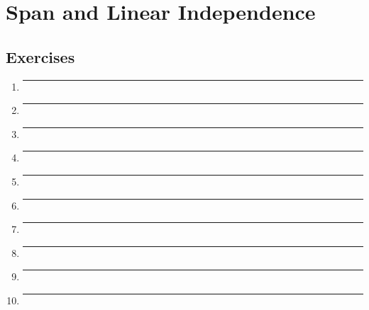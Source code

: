 \section*{Span and Linear Independence}
\subsection*{Exercises}


\begin{enumerate}[label=\textbf{\arabic*}]

  \item{
    \label{ssec: Ex2A-1}
    \lipsum[66]
    \bigbreak
    \hrule
    \bigbreak
  }

  \item{
    \lipsum[75]
    \bigbreak
    \hrule
    \bigbreak
  }

  \item{
    \lipsum[74]
    \bigbreak
    \hrule
    \bigbreak
  }

  \item{
    \lipsum[28]
    \bigbreak
    \hrule
    \bigbreak
  }

  \item{
    \lipsum[32]
    \bigbreak
    \hrule
    \bigbreak
  }

  \item{
    \lipsum[27]
    \bigbreak
    \hrule
    \bigbreak
  }

  \item{
    \lipsum[4]
    \bigbreak
    \hrule
    \bigbreak
  }

  \item{
    \lipsum[17]
    \bigbreak
    \hrule
    \bigbreak
  }

  \item{
    \lipsum[6]
    \bigbreak
    \hrule
    \bigbreak
  }

  \item{
    \lipsum[43]
    \bigbreak
    \hrule
    \bigbreak
  }


\end{enumerate}
